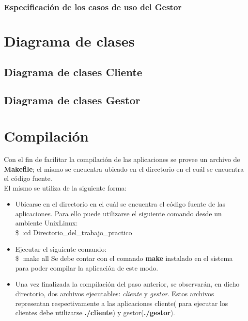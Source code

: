 \documentclass[11pt]{article}
\begin{document}
\subsubsection{Especificaci\'on de los casos de uso del Gestor}





\newpage

\section{Diagrama de clases}

\subsection{Diagrama de clases Cliente}

\subsection{Diagrama de clases Gestor}

\newpage
\section{Compilaci\'on}
Con el fin de facilitar la compilaci\'on de las aplicaciones se provee un archivo de {\bf Makefile}; el mismo se encuentra ubicado en 
el directorio en el cu\'al se encuentra el c\'odigo fuente. \\
El mismo se utiliza de la siguiente forma:
\begin{itemize}
 \item Ubicarse en el directorio en el cu\'al se encuentra el c\'odigo fuente de las aplicaciones. Para ello puede utilizarse el siguiente 
comando desde un ambiente Unix\/Linux:\\
\$~:cd Directorio\_del\_trabajo\_practico
\item Ejecutar el siguiente comando: \\
\$~:make all
\subitem * Se debe contar con el comando {\bf make} instalado en el sistema para poder compilar la aplicaci\'on de este modo.
\item Una vez finalizada la compilaci\'on del paso anterior, se observar\'an, en dicho directorio, dos archivos ejecutables: \textit{cliente} y \textit{gestor}. 
Estos archivos representan respectivamente a las aplicaciones cliente( para ejecutar los clientes debe utilizarse {\bf ./cliente}) y gestor({\bf ./gestor}). 
\end{itemize}
\end{document}
